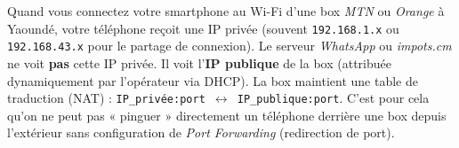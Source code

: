 \documentclass[11pt]{article}
\newcommand{\cle}[1]{{\popxbold\color{popdark}#1}}
\begin{document}
\begin{savaistu}
Quand vous connectez votre smartphone au Wi-Fi d'une box \emph{MTN} ou \emph{Orange} à Yaoundé, votre téléphone reçoit une IP privée (souvent \texttt{192.168.1.x} ou \texttt{192.168.43.x} pour le partage de connexion). Le serveur \emph{WhatsApp} ou \emph{impots.cm} ne voit \textbf{pas} cette IP privée. Il voit l'\textbf{IP publique} de la box (attribuée dynamiquement par l'opérateur via \cle{DHCP}). La box maintient une table de traduction (NAT) : \texttt{IP\_privée:port $\leftrightarrow$ IP\_publique:port}. C'est pour cela qu'on ne peut pas « pinguer » directement un téléphone derrière une box depuis l'extérieur sans configuration de \emph{Port Forwarding} (redirection de port).
\end{savaistu}
\end{document}
